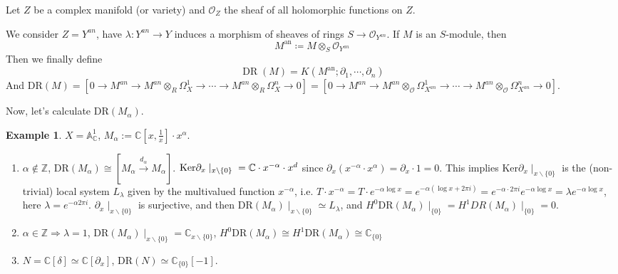 \documentclass[openany]{book}
\theoremstyle{definition} %
\newtheorem{example}[theorem]{Example}       %
\theoremstyle{remark}
\begin{document}
Let $Z$ be a complex manifold (or variety) and $\mathcal{O}_{Z}$ the sheaf of all holomorphic functions on $Z$.

We consider $Z=Y^{an}$, have $\lambda:Y^{an}\rightarrow Y$ induces a morphism of sheaves of rings $S \longrightarrow \mathcal{O}_{Y^{an}}$. If $M$ is an $S$-module, then $$
    M^{\text{an}} \coloneqq M \otimes_S \mathcal{O}_{Y^{an}}
$$Then we finally define
$$
    \operatorname{DR}(M) = K(M^{\text{an}}; \partial_1, \cdots, \partial_n)
$$
And $\mathrm{DR}(M)=[0 \rightarrow M^{an} \rightarrow M^{an} \otimes_R \Omega^1_X \rightarrow \cdots \rightarrow M^{an} \otimes_R \Omega^n_X \rightarrow0]=[0 \rightarrow M^{an} \rightarrow M^{an} \otimes_{\mathcal{O}} \Omega^1_{X^{an}} \rightarrow \cdots \rightarrow M^{an} \otimes_{\mathcal{O}} \Omega^n_{X^{an}}  \rightarrow0]$.

Now, let's calculate $\mathrm{DR}(M_{\mathfrak{\alpha}})$.

\begin{example}
    $X = \mathbb{A}^1_{\mathbb{C}}$,  $M_{\alpha} := \mathbb{C}[x, \frac{1}{x}] \cdot x^{\alpha}$.
    \begin{enumerate}
        \item $\alpha \not\in \mathbb{Z}$, $\mathrm{DR}(M_{\alpha}) \cong [M_{\alpha} \xrightarrow{d_{\alpha}} M_{\alpha}]$.
              $\text{Ker}\partial_{x} \mid_{x \backslash \{0\}} \\ = \mathbb{C} \cdot x^{-\alpha} \cdot x^{d}$ since $\partial_{x}(x^{-\alpha}\cdot x^{\alpha})=\partial_{x}\cdot 1=0$. This implies $\text{Ker}\partial_{x} \mid_{x \backslash \{0\}}$ is the (non-trivial) local system $L_{\lambda}$ given by the multivalued function $x^{-\alpha}$, i.e. $T \cdot x^{-\alpha} = T \cdot e^{-\alpha \log x}= e^{-\alpha(\log x + 2\pi i)} = e^{-\alpha \cdot 2\pi i} e^{-\alpha \log x}= \lambda e^{-\alpha \log x}$, here $\lambda=e^{-\alpha2\pi i}$.
              $\partial_{x} \mid_{x \backslash \{0\}}$ is surjective, and then $\mathrm{DR}(M_{\alpha}) \mid_{x \backslash \{0\}} \simeq L_{\lambda}$, and  $H^{0}\mathrm{DR}(M_{\alpha}) \mid_{\{0\}} = H^{1}DR(M_{\alpha}) \mid_{\{0\}} = 0$.
        \item $\alpha \in \mathbb{Z} \Rightarrow \lambda = 1$, $\mathrm{DR}(M_{\alpha}) \mid_{x \backslash \{0\}} = \mathbb{C}_{x \backslash \{0\}}$, $H^{0}\mathrm{DR}(M_{\alpha}) \cong H^{1}\mathrm{DR}(M_{\alpha}) \cong \mathbb{C}_{\{0\}}$
        \item $N=\mathbb{C}[\delta]\simeq \mathbb{C}[\partial_{x}]$, $\mathrm{DR}(N)\simeq \mathbb{C}_{\{0\}}[-1]$.
    \end{enumerate}
\end{example}
\end{document}

